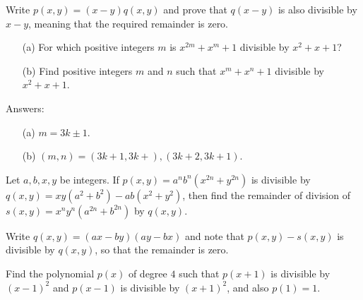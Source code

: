 \begin{solution}[name=Solution by Parviz Shahriari]
Write $p(x,y)=(x-y)q(x,y)$ and prove that $q(x-y)$ is also divisible by $x-y$, meaning that the required remainder is zero.
\end{solution}


\begin{tcolorbox}
\begin{question}
\begin{itemize}
    \item[(a)] For which positive integers $m$ is $x^{2m}+x^m+1$ divisible by $x^2+x+1$?
    \item[(b)] Find positive integers $m$ and $n$ such that $x^{m}+x^n+1$ divisible by $x^2+x+1$.
\end{itemize}
\end{question}
\end{tcolorbox}

\begin{solution}[name=Solution by Parviz Shahriari]
Answers:
\begin{itemize}
    \item[(a)] $m=3k \pm 1$.
    \item[(b)] $(m,n)= (3k+1,3k+), (3k+2,3k+1)$. 
\end{itemize}
\end{solution}


\begin{tcolorbox}
\begin{question}
Let $a,b,x,y$ be integers. If $p(x,y)=a^nb^n(x^{2n}+y^{2n})$ is divisible by $q(x,y)=xy(a^2+b^2)-ab(x^2+y^2)$, then find the remainder of division of $s(x,y)=x^ny^n(a^{2n}+b^{2n})$ by $q(x,y)$. 
\end{question}
\end{tcolorbox}

\begin{solution}[name=Solution by Parviz Shahriari]
Write $q(x,y) = (ax-by)(ay-bx)$ and note that $p(x,y) - s(x,y)$ is divisible by $q(x,y)$, so that the remainder is zero.
\end{solution}


\begin{tcolorbox}
\begin{question}
Find the polynomial $p(x)$ of degree $4$ such that $p(x+1)$ is divisible by $(x-1)^2$ and $p(x-1)$ is divisible by $(x+1)^2$, and also $p(1)=1$.
\end{question}
\end{tcolorbox}

